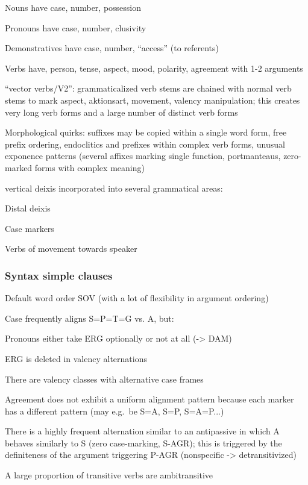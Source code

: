 \documentclass[a4paper, 11pt]{book}
\begin{document}
\begin{itemize*}
\item Nouns have case, number, possession
\item Pronouns have case, number, clusivity
\item Demonstratives have case, number, “access” (to referents)
\item Verbs have, person, tense, aspect, mood, polarity, agreement with 1-2 arguments
\item “vector verbs/V2”: grammaticalized verb stems are chained with normal verb stems to mark aspect, aktionsart, movement, valency manipulation; this creates very long verb forms and a large number of distinct verb forms
\item Morphological quirks: suffixes may be copied within a single word form, free prefix ordering, endoclitics and prefixes within complex verb forms, unusual exponence patterns (several affixes marking single function, portmanteaus, zero-marked forms with complex meaning)
\item vertical deixis incorporated into several grammatical areas:
        \begin{itemize*}
	\item Distal deixis
	\item Case markers
	\item Verbs of movement towards speaker
        \end{itemize*}
\end{itemize*}

\subsubsection*{Syntax simple clauses}

\begin{itemize*}
\item Default word order SOV (with a lot of flexibility in argument ordering)
\item Case frequently aligns S=P=T=G vs. A, but:
	\item Pronouns either take ERG optionally or not at all (-> DAM)
	\item ERG is deleted in valency alternations
	\item There are valency classes with alternative case frames
\item Agreement does not exhibit a uniform alignment pattern because each marker has a different pattern (may e.g.\ be S=A, S=P, S=A=P...)
\item There is a highly frequent alternation similar to an antipassive in which A behaves similarly to S (zero case-marking, S-AGR); this is triggered by the definiteness of the argument triggering P-AGR (nonspecific -> detransitivized)
\item A large proportion of transitive verbs are ambitransitive
\end{itemize*}
\end{document}

